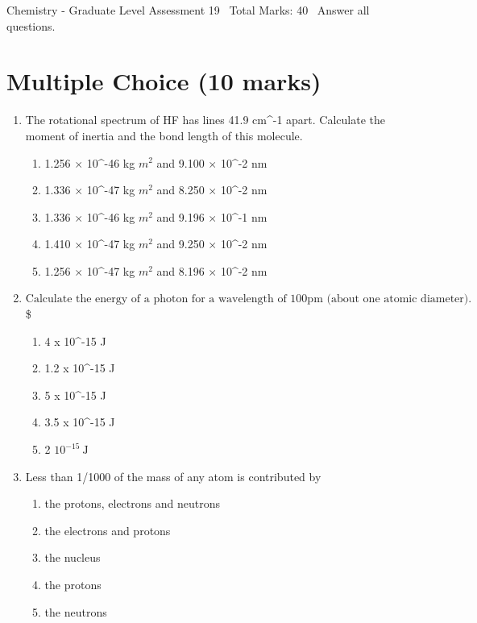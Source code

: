 \documentclass[12pt]{article}
\begin{document}
\begin{center}
Chemistry - Graduate Level Assessment 19 \
Total Marks: 40 \
Answer all questions.
\end{center}

\section*{Multiple Choice (10 marks)}
\begin{enumerate}[label=\arabic*.]
\item The rotational spectrum of HF has lines 41.9 cm^-1 apart. Calculate the moment of inertia and the bond length of this molecule.
\begin{enumerate}[label=(\alph*)]
    \item 1.256 \ensuremath{\times} 10^-46 kg $m^2$ and 9.100 \ensuremath{\times} 10^-2 nm
    \item 1.336 \ensuremath{\times} 10^-47 kg $m^2$ and 8.250 \ensuremath{\times} 10^-2 nm
    \item 1.336 \ensuremath{\times} 10^-46 kg $m^2$ and 9.196 \ensuremath{\times} 10^-1 nm
    \item 1.410 \ensuremath{\times} 10^-47 kg $m^2$ and 9.250 \ensuremath{\times} 10^-2 nm
    \item 1.256 \ensuremath{\times} 10^-47 kg $m^2$ and 8.196 \ensuremath{\times} 10^-2 nm
\end{enumerate}
\item $ \text {Calculate the energy of a photon for a wavelength of } 100 \mathrm{pm} \text { (about one atomic diameter). } $\$
\begin{enumerate}[label=(\alph*)]
    \item 4 x 10^-15 J
    \item 1.2 x 10^-15 J
    \item 5 x 10^-15 J
    \item 3.5 x 10^-15 J
    \item 2 $10^{-15} \mathrm{~J}$
\end{enumerate}
\item Less than 1/1000 of the mass of any atom is contributed by
\begin{enumerate}[label=(\alph*)]
    \item the protons, electrons and neutrons
    \item the electrons and protons
    \item the nucleus
    \item the protons
    \item the neutrons

\end{enumerate}
\end{enumerate}
\end{document}

